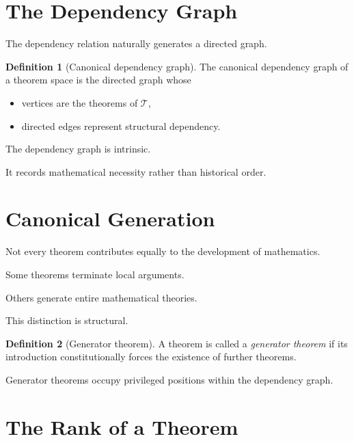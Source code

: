 \documentclass[13pt,openany]{book}
\theoremstyle{plain}
\theoremstyle{definition}
\newtheorem{definition}{Definition}[chapter]
\begin{document}
\section{The Dependency Graph}

The dependency relation naturally generates a directed graph.

\begin{definition}[Canonical dependency graph]
The canonical dependency graph of a theorem space is the directed graph whose

\begin{itemize}
\item vertices are the theorems of \(\mathcal T\),
\item directed edges represent structural dependency.
\end{itemize}
\end{definition}

The dependency graph is intrinsic.

It records mathematical necessity rather than historical order.

\section{Canonical Generation}

Not every theorem contributes equally to the development of mathematics.

Some theorems terminate local arguments.

Others generate entire mathematical theories.

This distinction is structural.

\begin{definition}[Generator theorem]
A theorem is called a \emph{generator theorem} if its introduction
constitutionally forces the existence of further theorems.
\end{definition}

Generator theorems occupy privileged positions within the dependency graph.

\section{The Rank of a Theorem}
\end{document}

